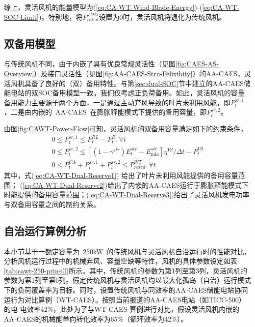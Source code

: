 综上，灵活风机的能量模型为(\ref{eq:CA-WT-Wind-Blade-Energy})-(\ref{eq:CA-WT-SOC-Limit})。特别地，将$P_{rated}^{VDM}$设置为0时，灵活风机将退化为传统风机。

\subsection{双备用模型}
\label{sec:ca-wt-model-reserve}
与传统风机不同，由于内嵌了具有优良常规灵活性（见图\ref{fig:CAES-AS-Overview}）及接口灵活性（见图\ref{fig:AA-CAES-Stru-Felixibity}）的AA-CAES，灵活风机具备了良好的（双）备用特性。与第\ref{sec:dual-SOC}节中建立的AA-CAES储能电站的双SOC备用模型一致，我们仅考虑正负荷备用。如此，灵活风机的容量备用能力主要源于两个方面，一是通过主动弃风导致的叶片未利用风能，即$P_t^{sr,1}$，二是由内嵌的~AA-CAES~在膨胀释能模式下提供的备用容量，即$P_t^{sr,2}$。

由图\ref{fig:CAWT-Power-Flow}可知，灵活风机的双备用容量满足如下的约束条件，
\begin{subequations}
\label{eq:CA-WT-Dual-Reserve}
\begin{gather}
0 \le P_t^{sr,1} \le P_t^{BL} - P_t^B,\forall t \label{eq:CA-WT-Dual-Reserve1}\\
0 \le P_t^{sr,2} \le \left[{(1-\gamma^{str})E_t^{str} - E_{\min }^{str}}\right]{\eta ^{Vd}}/{\Delta t} - P_t^{Vd}\label{eq:CA-WT-Dual-Reserve2}\\
0 \le P_t^{CA} + P_t^{sr,1} + P_t^{sr,2} \le P_{rated}^{WT},\forall t\label{eq:CA-WT-Dual-Reserve3}
\end{gather}
\end{subequations}
其中，式(\ref{eq:CA-WT-Dual-Reserve1}) 给出了叶片未利用风能提供的备用容量范围； (\ref{eq:CA-WT-Dual-Reserve2})给出了内嵌的AA-CAES运行于膨胀释能模式下时能提供的备用容量范围；(\ref{eq:CA-WT-Dual-Reserve3})给出了灵活风机发电功率与双备用容量之间的制约关系。

\subsection{自治运行算例分析}
本小节基于一额定容量为~250kW~的传统风机与灵活风机自治运行时的性能对比，分析风机运行过程中的机械弃风、容量空缺等特性，风机的具体参数设定如表\ref{tab:cawt-250-prin-ill}所示。其中，传统风机的参数为第1列至第3列，灵活风机的参数为第1列至第6列。假定传统风机与灵活风机均以最大化孤岛（自治）运行模式下的负荷覆盖率为目标。同时，设置传统风机与同效率的AA-CAES储能电站协同运行为对比算例（WT-CAES）。按照当前报道的AA-CAES电站（如TICC-500\cite{TICC-15}）的电-电效率42\%，此处为了与WT-CAES 算例进行对比，假设灵活风机内嵌的AA-CAES的机械能单向转化效率为65\%（循环效率为42\%）。

